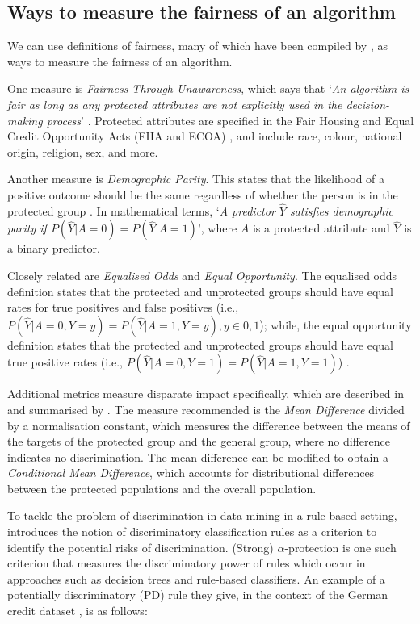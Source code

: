 \documentclass[conference]{IEEEtran}
\begin{document}
\subsection{Ways to measure the fairness of an algorithm}
We can use definitions of fairness, many of which have been compiled by \cite{DBLP:journals/corr/abs-1908-09635}, as ways to measure the fairness of an algorithm.

One measure is \emph{Fairness Through Unawareness}, which says that `\textit{An algorithm is fair as long as any protected attributes are not explicitly used in the decision-making process}' \cite{GrgicHlaca2016TheCF, NIPS2017_a486cd07}. Protected attributes are specified in the Fair Housing and Equal Credit Opportunity Acts (FHA and ECOA) \cite{Chen_2019}, and include race, colour, national origin, religion, sex, and more.

Another measure is \emph{Demographic Parity}. This states that the likelihood of a positive outcome should be the same regardless of whether the person is in the protected group \cite{10.1145/3194770.3194776}. In mathematical terms, `\textit{A predictor $\hat{Y}$ satisfies demographic parity if $P(\hat{Y}|A=0) = P(\hat{Y}|A=1)$}', where $A$ is a protected attribute and $\hat{Y}$ is a binary predictor.  

Closely related are \textit{Equalised Odds} and \textit{Equal Opportunity}. The equalised odds definition states that the protected and unprotected groups should have equal rates for true positives and false positives (i.e., $P(\hat{Y}|A=0, Y=y) = P(\hat{Y}|A=1, Y=y), y \in {0,1}$); while, the equal opportunity definition states that the protected and unprotected groups should have equal true positive rates (i.e., $P(\hat{Y}|A=0, Y=1) = P(\hat{Y}|A=1, Y=1)$) \cite{DBLP:journals/corr/HardtPS16}.

Additional metrics measure disparate impact specifically, which are described in \cite{DBLP:journals/corr/Zliobaite15a} and summarised by \cite{d_Alessandro_2017}. The measure recommended is the \emph{Mean Difference} divided by a normalisation constant, which measures the difference between the means of the targets of the protected group and the general group, where no difference indicates no discrimination. The mean difference can be modified to obtain a \emph{Conditional Mean Difference}, which accounts for distributional differences between the protected populations and the overall population.

To tackle the problem of discrimination in data mining in a rule-based setting, \cite{10.1145/1401890.1401959} introduces the notion of discriminatory classification rules as a criterion to identify the potential risks of discrimination. (Strong) $\alpha$-protection is one such criterion that measures the discriminatory power of rules which occur in approaches such as decision trees and rule-based classifiers. An example of a potentially discriminatory (PD) rule they give, in the context of the German credit dataset \cite{Dua:2019}, is as follows: 
\end{document}
